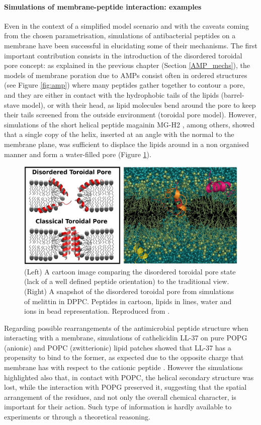 \paragraph{Simulations of membrane-peptide interaction: examples} Even in the context of a simplified model scenario and with the caveats coming from the chosen parametrisation, simulations of antibacterial peptides on a membrane have been successful in elucidating some of their mechanisms.
%
The first important contribution consists in the introduction of the disordered toroidal pore concept: as explained in the previous chapter (Section \ref{AMP_mechs}), the models of membrane poration due to AMPs consist often in ordered structures (see Figure \ref{fig:amp}) %
where many peptides gather together to contour a pore, and they are either in contact with the hydrophobic tails of the lipids (barrel-stave model), or with their head, as lipid molecules bend around the pore to keep their tails screened from the outside environment (toroidal pore model). However, simulations of the short helical peptide magainin MG-H2 \cite{Leontiadou2006}, among others, showed that a single copy of the helix, inserted at an angle with the normal to the membrane plane, was sufficient to displace the lipids around in a non organised manner and form a water-filled pore (Figure \ref{fig:dis_pore}).
%
\begin{figure}[t!]
\centering
\includegraphics[width=0.8\linewidth]{2methods/pics/disordered_pore.jpg}
%
\caption[Disordered pore model]{(Left) A cartoon image comparing the disordered toroidal pore state (lack of a well defined peptide orientation) to the traditional view. (Right) A snapshot of the disordered toroidal pore from simulations of melittin in DPPC. Peptides in cartoon, lipids in lines, water and ions in bead representation. Reproduced from \cite{Sengupta2008}.}
\label{fig:dis_pore}
\end{figure}

Regarding possible rearrangements of the antimicrobial peptide structure when interacting with a membrane, simulations of cathelicidin LL-37 on pure POPG (anionic) and POPC (zwitterionic) lipid patches showed that LL-37 has a propensity to bind to the former, as expected due to the opposite charge that membrane has with respect to the cationic peptide \cite{Zhao2018}. However the simulations highlighted also that, in contact with POPC, the helical secondary structure was lost, while the interaction with POPG preserved it, suggesting that the spatial arrangement of the residues, and not only the overall chemical character, is important for their action. Such type of information is hardly available to experiments or through a theoretical reasoning.

